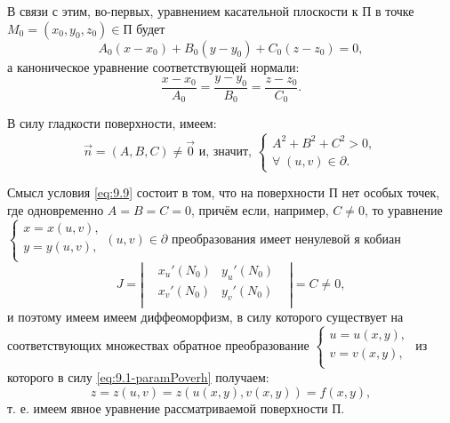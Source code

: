 В связи с этим, во-первых, уравнением касательной плоскости к П  в точке  ${ M_0 = (x_0, y_0, z_0) \in \text{П} }$ будет
\begin{equation}
    \label{eq:9.7-kasatPlosk}
    A_0(x-x_0) + B_0(y-y_0) + C_0(z-z_0) = 0,
\end{equation}
а каноническое уравнение соответствующей нормали:
\begin{equation}
    \label{eq:9.8-normalCanonical}
    \dfrac{x-x_0}{A_0} = \dfrac{y-y_0}{B_0} = \dfrac{z-z_0}{C_0}.
\end{equation}

В силу гладкости поверхности, имеем:
\begin{equation}
    \label{eq:9.9}
    \vec{n} = (A, B, C) \neq \vec{0} \text{ и, значит, } 
    \begin{cases}
        A^2 + B^2 + C^2 > 0, \\
        \forall \; (u, v) \in \partial.
    \end{cases}
\end{equation}

Смысл условия \eqref{eq:9.9} состоит в том, что на поверхности П нет особых точек, где одновременно $ A=B=C=0 $, причём если, например, $ C \neq 0 $, то уравнение
${ \begin{cases}
    x = x(u, v), \\
    y = y(u, v), \\
\end{cases} (u, v) \in \partial }$
преобразования имеет ненулевой я	кобиан 
\begin{equation*}
     J = \left|\begin{matrix}
        & x_u'(N_0) & y_u'(N_0) & \\
        & x_v'(N_0) & y_v'(N_0) & \\
    \end{matrix}\right| = C \neq 0,
\end{equation*}
и поэтому имеем имеем диффеоморфизм, в силу которого существует на соответствующих множествах обратное преобразование
$ \begin{cases}
    u = u(x, y), \\
    v = v(x, y), \\
\end{cases} $
из которого в силу \eqref{eq:9.1-paramPoverh} получаем:
\begin{equation*}
    z = z(u, v) = z(u(x,y), v(x, y)) = f(x, y),
\end{equation*}
т. е. имеем явное уравнение рассматриваемой поверхности П.


